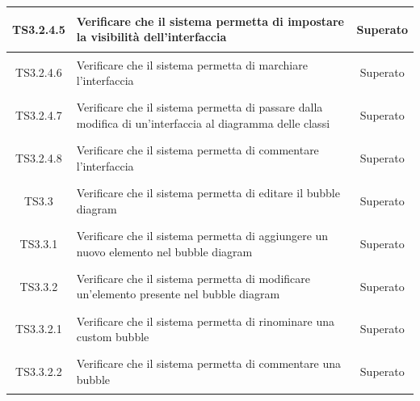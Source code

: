 \documentclass[../PianoDiQualifica.tex]{subfiles}
\begin{document}
\begin{longtable}{|c|>{\centering}p{10cm}|c|}
	\hline
	\hypertarget{TS3.2.4.5}{TS3.2.4.5} & Verificare che il sistema permetta di impostare la visibilità dell'interfaccia & Superato \\
	\hline
	\hypertarget{TS3.2.4.6}{TS3.2.4.6} & Verificare che il sistema permetta di marchiare l'interfaccia & Superato \\
	\hline
	\hypertarget{TS3.2.4.7}{TS3.2.4.7} & Verificare che il sistema permetta di passare dalla modifica di un'interfaccia al diagramma delle classi & Superato \\
	\hline
	\hypertarget{TS3.2.4.8}{TS3.2.4.8} & Verificare che il sistema permetta di commentare l'interfaccia & Superato \\

	
	\hline
	\hypertarget{TS3.3}{TS3.3} & Verificare che il sistema permetta di editare il bubble diagram & Superato \\
	\hline
	\hypertarget{TS3.3.1}{TS3.3.1} & Verificare che il sistema permetta di aggiungere un nuovo elemento nel bubble diagram & Superato \\
	\hline
	\hypertarget{TS3.3.2}{TS3.3.2} & Verificare che il sistema permetta di modificare un'elemento presente nel bubble diagram & Superato \\
	\hline
	\hypertarget{TS3.3.2.1}{TS3.3.2.1} & Verificare che il sistema permetta di rinominare una custom bubble & Superato\\
	\hline
	\hypertarget{TS3.3.2.2}{TS3.3.2.2} & Verificare che il sistema permetta di commentare una bubble & Superato \\

\end{longtable}
\end{document}
